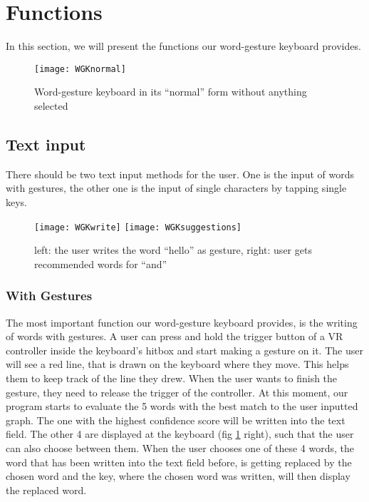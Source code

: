 \section{Functions}
In this section, we will present the functions our word-gesture keyboard provides.
\begin{figure}
\centering
\texttt{[image: WGKnormal]}
\caption{Word-gesture keyboard in its ``normal'' form without anything selected}
\end{figure}
    
\subsection{Text input}
There should be two text input methods for the user. One is the input of words with gestures, the other one is the input of single characters by tapping single keys.

\begin{figure}
\centering
\texttt{[image: WGKwrite]}
\texttt{[image: WGKsuggestions]}
\caption{left: the user writes the word ``hello'' as gesture, right: user gets recommended words for ``and''}
\label{fig:write_suggestions}
\end{figure}

\subsubsection{With Gestures}
The most important function our word-gesture keyboard provides, is the writing of words with gestures. A user can press and hold the trigger button of a VR controller inside the keyboard's hitbox and start making a gesture on it. The user will see a red line, that is drawn on the keyboard where they move. This helps them to keep track of the line they drew. When the user wants to finish the gesture, they need to release the trigger of the controller. At this moment, our program starts to evaluate the 5 words with the best match to the user inputted graph. The one with the highest confidence score will be written into the text field. The other 4 are displayed at the keyboard (fig \ref{fig:write_suggestions} right), such that the user can also choose between them. When the user chooses one of these 4 words, the word that has been written into the text field before, is getting replaced by the chosen word and the key, where the chosen word was written, will then display the replaced word.
